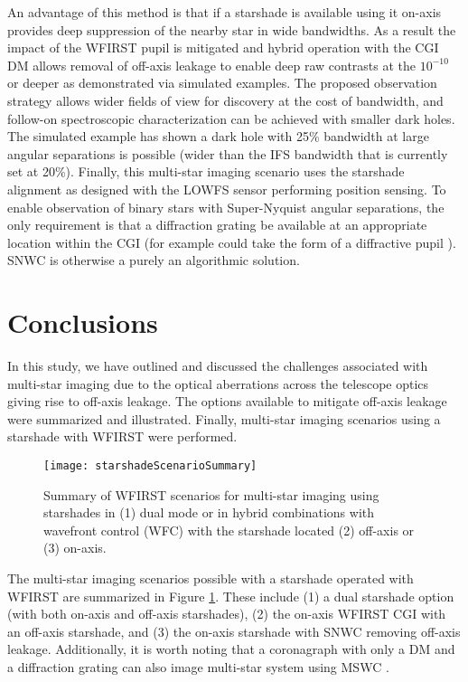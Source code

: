 \documentclass[]{spie}  %
\begin{document}
An advantage of this method is that if a starshade is available using it on-axis provides deep suppression of the nearby star in wide bandwidths. As a result the impact of the WFIRST pupil is mitigated and hybrid operation with the CGI DM allows removal of off-axis leakage to enable deep raw contrasts at the $10^{-10}$ or deeper as demonstrated via simulated examples. The proposed observation strategy allows wider fields of view for discovery at the cost of bandwidth, and follow-on spectroscopic characterization can be achieved with smaller dark holes. The simulated example has shown a dark hole with 25\% bandwidth at large angular separations is possible (wider than the IFS bandwidth that is currently set at 20\%). Finally, this multi-star imaging scenario uses the starshade alignment as designed with the LOWFS sensor performing position sensing. To enable observation of binary stars with Super-Nyquist angular separations, the only requirement is that a diffraction grating be available at an appropriate location within the CGI (for example could take the form of a diffractive pupil \cite{Bendek13}). SNWC is otherwise a purely an algorithmic solution.

\section{Conclusions}  \label{sect:conc}

In this study, we have outlined and discussed the challenges associated with multi-star imaging due to the optical aberrations across the telescope optics giving rise to off-axis leakage. The options available to mitigate off-axis leakage were summarized and illustrated. Finally, multi-star imaging scenarios using a starshade with WFIRST were performed.

\begin{figure}[t!]
\centering
\texttt{[image: starshadeScenarioSummary]}
\caption[Summary Table]
{\label{fig:starshadeMultiStarSummary} Summary of WFIRST scenarios for multi-star imaging using starshades in (1) dual mode or in hybrid combinations with wavefront control (WFC) with the starshade located (2) off-axis or (3) on-axis.}
\end{figure}

The multi-star imaging scenarios possible with a starshade operated with WFIRST are summarized in Figure \ref{fig:starshadeMultiStarSummary}. These include (1) a dual starshade option (with both on-axis and off-axis starshades), (2) the on-axis WFIRST CGI with an off-axis starshade, and (3) the on-axis starshade with SNWC removing off-axis leakage. Additionally, it is worth noting that a coronagraph with only a DM and a diffraction grating can also image multi-star system using MSWC \cite{Belikov17, Sirbu17}.
\end{document}
